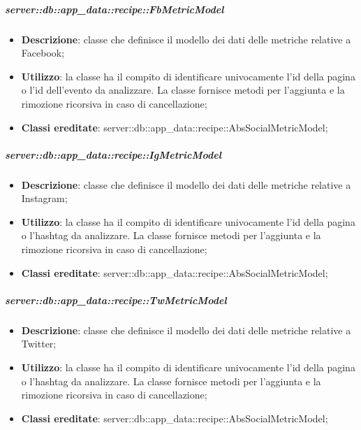 		\subparagraph{server::db::app\_data::recipe::FbMetricModel} %
		\label{subp:server_db_app_data_recipe_fbmetricmodel}
			\begin{itemize}
				\item \textbf{Descrizione}: classe che definisce il modello dei dati delle metriche relative a Facebook;
				\item \textbf{Utilizzo}: la classe ha il compito di identificare univocamente l'id della pagina o l'id dell'evento da analizzare. La classe fornisce metodi per l'aggiunta e la rimozione ricorsiva in caso di cancellazione;
				\item \textbf{Classi ereditate}: server::db::app\_data::recipe::AbsSocialMetricModel;
			\end{itemize}


		\subparagraph{server::db::app\_data::recipe::IgMetricModel} %
		\label{subp:server_db_app_data_recipe_igmetricmodel}
			\begin{itemize}
				\item \textbf{Descrizione}: classe che definisce il modello dei dati delle metriche relative a Instagram;
				\item \textbf{Utilizzo}: la classe ha il compito di identificare univocamente l'id della pagina o l'hashtag da analizzare. La classe fornisce metodi per l'aggiunta e la rimozione ricorsiva in caso di cancellazione;
				\item \textbf{Classi ereditate}: server::db::app\_data::recipe::AbsSocialMetricModel;
			\end{itemize}


		\subparagraph{server::db::app\_data::recipe::TwMetricModel} %
		\label{subp:server_db_app_data_recipe_twmetricmodel}
			\begin{itemize}
				\item \textbf{Descrizione}: classe che definisce il modello dei dati delle metriche relative a Twitter;
				\item \textbf{Utilizzo}: la classe ha il compito di identificare univocamente l'id della pagina o l'hashtag da analizzare. La classe fornisce metodi per l'aggiunta e la rimozione ricorsiva in caso di cancellazione;
				\item \textbf{Classi ereditate}: server::db::app\_data::recipe::AbsSocialMetricModel;
			\end{itemize}
